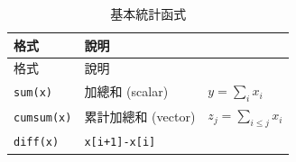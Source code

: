 \documentclass[
]{book}
\begin{document}
\begin{longtable}[]{@{}lll@{}}
\caption{基本統計函式}\tabularnewline
\toprule
\begin{minipage}[b]{0.19\columnwidth}\raggedright
格式\strut
\end{minipage} & \begin{minipage}[b]{0.21\columnwidth}\raggedright
說明\strut
\end{minipage} & \begin{minipage}[b]{0.51\columnwidth}\raggedright
\strut
\end{minipage}\tabularnewline
\midrule
\endfirsthead
\toprule
\begin{minipage}[b]{0.19\columnwidth}\raggedright
格式\strut
\end{minipage} & \begin{minipage}[b]{0.21\columnwidth}\raggedright
說明\strut
\end{minipage} & \begin{minipage}[b]{0.51\columnwidth}\raggedright
\strut
\end{minipage}\tabularnewline
\midrule
\endhead
\begin{minipage}[t]{0.19\columnwidth}\raggedright
\texttt{sum(x)}\strut
\end{minipage} & \begin{minipage}[t]{0.21\columnwidth}\raggedright
加總和 (scalar)\strut
\end{minipage} & \begin{minipage}[t]{0.51\columnwidth}\raggedright
\(y = \sum_i x_i\)\strut
\end{minipage}\tabularnewline
\begin{minipage}[t]{0.19\columnwidth}\raggedright
\texttt{cumsum(x)}\strut
\end{minipage} & \begin{minipage}[t]{0.21\columnwidth}\raggedright
累計加總和 (vector)\strut
\end{minipage} & \begin{minipage}[t]{0.51\columnwidth}\raggedright
\(z_j = \sum_{i \le j} x_i\)\strut
\end{minipage}\tabularnewline
\begin{minipage}[t]{0.19\columnwidth}\raggedright
\texttt{diff(x)}\strut
\end{minipage} & \begin{minipage}[t]{0.21\columnwidth}\raggedright
\texttt{x{[}i+1{]}-x{[}i{]}}\strut
\end{minipage} & \begin{minipage}[t]{0.51\columnwidth}\raggedright

\end{minipage}
\end{longtable}
\end{document}
